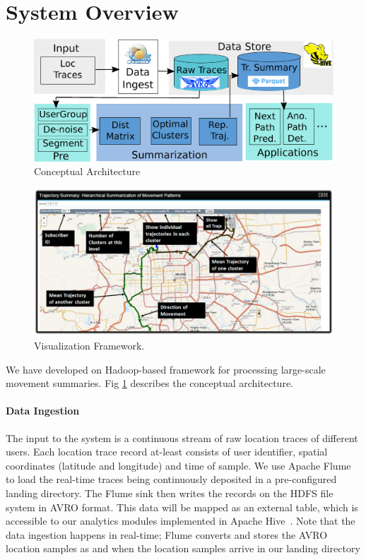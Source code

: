 \section{System Overview}
\label{sec:system}
\begin{figure}
\centering
\includegraphics[scale=0.15]{figs/arch1.eps}
\caption{Conceptual Architecture}
\label{fig:flow}
\end{figure}

\begin{figure}
    \centering   
		\includegraphics[scale=0.5]{figs/visual.eps}
		\caption{Visualization Framework.}
		\label{fig:vis}  
\end{figure}

We have developed \trajSummary on Hadoop-based framework for processing large-scale movement summaries. Fig \ref{fig:flow} describes the conceptual architecture. 

\paragraph{Data Ingestion} 
The input to the system is a continuous stream of raw location traces of different users. Each location trace record at-least consists of user identifier, spatial coordinates (latitude and longitude) and time of sample. We use Apache Flume~\cite{flume} to load the real-time traces being continuously deposited in a pre-configured landing directory. The Flume sink then writes the records on the HDFS file system in AVRO format. This data will be mapped as an external table, which is accessible to our analytics modules implemented in Apache Hive~\cite{hive}. Note that the data ingestion happens in real-time; Flume converts and stores the AVRO location samples as and when the location samples arrive in our landing directory

